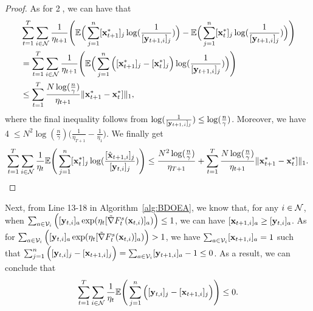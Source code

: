 \begin{proof}
	As for \textcircled{2}, we can have that
	\begin{equation*}
		\begin{aligned}
			&\sum_{t=1}^{T}\sum_{i\in\mathcal{N}}\frac{1}{\eta_{t+1}}\Bigg(\mathbb{E}\Big(\sum_{j=1}^{n}[\mathbf{x}_{t+1}^{*}]_{j}\log(\frac{1}{[\mathbf{y}_{t+1,i}]_{j}})\Big)-\mathbb{E}\Big(\sum_{j=1}^{n}[\mathbf{x}_{t}^{*}]_{j}\log(\frac{1}{[\mathbf{y}_{t+1,i}]_{j}})\Big)\Bigg)\\
			&=\sum_{t=1}^{T}\sum_{i\in\mathcal{N}}\frac{1}{\eta_{t+1}}\Bigg(\mathbb{E}\Big(\sum_{j=1}^{n}\Big([\mathbf{x}_{t+1}^{*}]_{j}-[\mathbf{x}_{t}^{*}]_{j}\Big)\log(\frac{1}{[\mathbf{y}_{t+1,i}]_{j}})\Big)\Bigg)\\
			&\le\sum_{t=1}^{T}\frac{N\log(\frac{n}{\gamma})}{\eta_{t+1}}\|\mathbf{x}_{t+1}^{*}-\mathbf{x}_{t}^{*}]\|_{1}, 
		\end{aligned}
	\end{equation*} where the final inequality follows from  $\log(\frac{1}{[\mathbf{y}_{t+1,i}]_{j}})\le\log(\frac{n}{\gamma})$.
	Moreover, we have \textcircled{4}$\le N^{2}\log(\frac{n}{\gamma})\Big(\frac{1}{\eta_{T+1}}-\frac{1}{\eta_{1}}\Big)$. We finally get 
	\begin{equation*}
		\sum_{t=1}^{T}\sum_{i\in\mathcal{N}}\frac{1}{\eta_{t}}\mathbb{E}\Bigg(\sum_{j=1}^{n}[\mathbf{x}_{t}^{*}]_{j}\log(\frac{[\hat{\mathbf{x}}_{t+1,i}]_{j}}{[\mathbf{y}_{t,i}]_{j}})\Bigg)\le\frac{N^{2}\log(\frac{n}{\gamma})}{\eta_{T+1}}+\sum_{t=1}^{T}\frac{N\log(\frac{n}{\gamma})}{\eta_{t+1}}\|\mathbf{x}_{t+1}^{*}-\mathbf{x}_{t}^{*}]\|_{1}.
	\end{equation*}
\end{proof}
Next, from Line 13-18 in Algorithm~\ref{alg:BDOEA}, we know that, for any $i\in\mathcal{N}$, when $\sum_{a\in\mathcal{V}_{i}}\Big(	[\mathbf{y}_{t,i}]_{a}\exp(\eta_{t}[\tilde{\nabla} F_{t}^{s}(\mathbf{x}_{t,i})]_{a})\Big)\le1$, we can have $[\mathbf{x}_{t+1,i}]_{a}\ge[\mathbf{y}_{t,i}]_{a}$. As for $\sum_{a\in\mathcal{V}_{i}}\Big(	[\mathbf{y}_{t,i}]_{a}\exp(\eta_{t}[\tilde{\nabla} F_{t}^{s}(\mathbf{x}_{t,i})]_{a})\Big)>1$, we have $\sum_{a\in\mathcal{V}_{i}}[\mathbf{x}_{t+1,i}]_{a}=1$ such that $\sum_{j=1}^{n}\Big([\mathbf{y}_{t,i}]_{j}-[\mathbf{x}_{t+1,i}]_{j}\Big)=\sum_{a\in\mathcal{V}_{i}}[\mathbf{y}_{t+1,i}]_{a}-1\le0$. As a result,  we can conclude that
 \begin{equation*}
\sum_{t=1}^{T}\sum_{i\in\mathcal{N}}\frac{1}{\eta_{t}}\mathbb{E}\Bigg(\sum_{j=1}^{n}\Big([\mathbf{y}_{t,i}]_{j}-[\mathbf{x}_{t+1,i}]_{j}\Big)\Bigg)\le0.
 \end{equation*}

